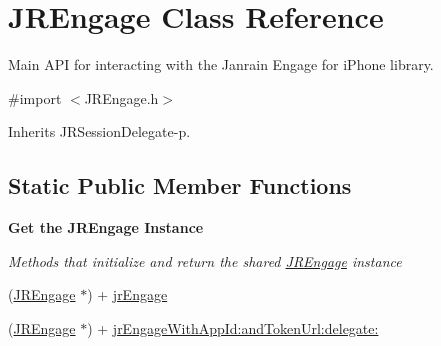 \hypertarget{class_j_r_engage}{
\section{JREngage Class Reference}
\label{class_j_r_engage}
}


Main API for interacting with the Janrain Engage for iPhone library.  




{\ttfamily \#import $<$JREngage.h$>$}



Inherits JRSessionDelegate-\/p.

\subsection*{Static Public Member Functions}
\begin{Indent}{\bf Get the JREngage Instance}\par
{\em \label{_amgrp1563bd99b5767462283658c6804d90b3}
 Methods that initialize and return the shared \hyperlink{class_j_r_engage}{JREngage} instance }\begin{DoxyCompactItemize}
\item 
(\hyperlink{class_j_r_engage}{JREngage} $\ast$) + \hyperlink{class_j_r_engage_adb6bf3a6869d83f2bfce0783f128d9e6}{jrEngage}
\item 
(\hyperlink{class_j_r_engage}{JREngage} $\ast$) + \hyperlink{class_j_r_engage_a36c199d6384893b1bf42712771af1e8b}{jrEngageWithAppId:andTokenUrl:delegate:}
\end{DoxyCompactItemize}
\end{Indent}
